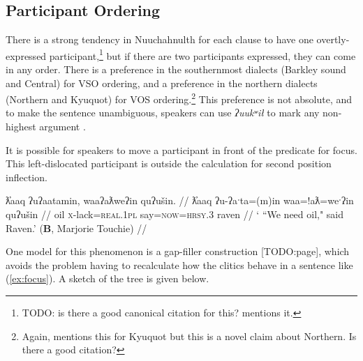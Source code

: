 
\subsection{Participant Ordering}

There is a strong tendency in Nuuchahnulth for each clause to have one overtly-expressed participant,\footnote{TODO: is there a good canonical citation for this? \cite{rose1981} mentions it.} but if there are two participants expressed, they can come in any order. There is a preference in the southernmost dialects (Barkley sound and Central) for VSO ordering, and a preference in the northern dialects (Northern and Kyuquot) for VOS ordering.\footnote{Again, \cite{rose1981} mentions this for Kyuquot but this is a novel claim about Northern. Is there a good citation?} This preference is not absolute, and to make the sentence unambiguous, speakers can use \textit{ʔuukʷił} to mark any non-highest argument \citep{woo2007b}.

It is possible for speakers to move a participant in front of the predicate for focus. This left-dislocated participant is outside the calculation for second position inflection.

\ex \label{ex:focus}
\begingl
\glpreamble ƛ̓aaq ʔuʔaatamin, waaʔaƛweʔin quʔušin. //
\gla ƛ̓aaq ʔu-ʔaˑta=(m)in waa=!aƛ=weˑʔin quʔušin //
\glb oil \textsc{x}-lack=\textsc{real.1pl} say=\textsc{now}=\textsc{hrsy.3} raven //
\glft ‘ ``We need oil," said Raven.’ (\textbf{B}, Marjorie Touchie) //
\endgl
\xe

One model for this phenomenon is a gap-filler construction \citep{pollardsag1994}[TODO:page], which avoids the problem having to recalculate how the clitics behave in a sentence like (\ref{ex:focus}). A sketch of the tree is given below.

